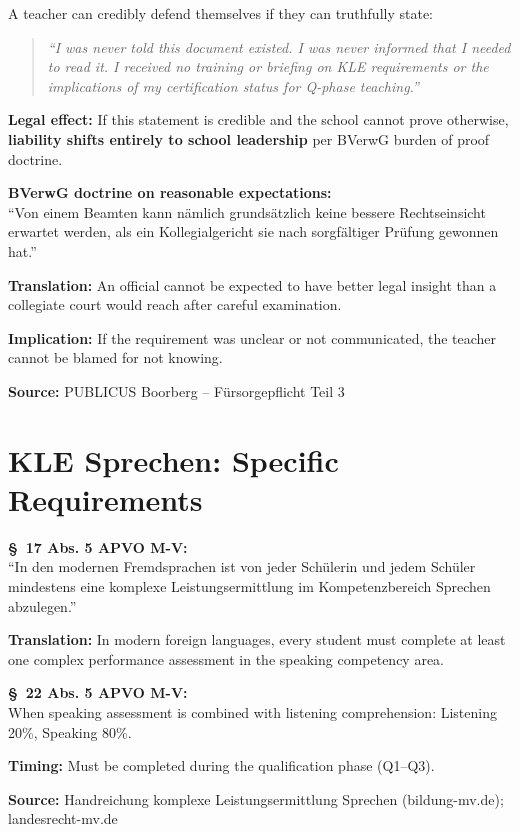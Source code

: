 \documentclass[11pt,a4paper]{article}
\begin{document}
\begin{infobox}
A teacher can credibly defend themselves if they can truthfully state:

\begin{quote}
\textit{``I was never told this document existed. I was never informed that I needed to read it. I received no training or briefing on KLE requirements or the implications of my certification status for Q-phase teaching.''}
\end{quote}

\textbf{Legal effect:} If this statement is credible and the school cannot prove otherwise, \textbf{liability shifts entirely to school leadership} per BVerwG burden of proof doctrine.
\end{infobox}

\begin{sourcebox}
\textbf{BVerwG doctrine on reasonable expectations:}\\
``Von einem Beamten kann nämlich grundsätzlich keine bessere Rechtseinsicht erwartet werden, als ein Kollegialgericht sie nach sorgfältiger Prüfung gewonnen hat.''

\textbf{Translation:} An official cannot be expected to have better legal insight than a collegiate court would reach after careful examination.

\textbf{Implication:} If the requirement was unclear or not communicated, the teacher cannot be blamed for not knowing.

\textbf{Source:} PUBLICUS Boorberg -- Fürsorgepflicht Teil 3
\end{sourcebox}

\section{KLE Sprechen: Specific Requirements}

\begin{sourcebox}
\textbf{\S~17 Abs. 5 APVO M-V:}\\
``In den modernen Fremdsprachen ist von jeder Schülerin und jedem Schüler mindestens eine komplexe Leistungsermittlung im Kompetenzbereich Sprechen abzulegen.''

\textbf{Translation:} In modern foreign languages, every student must complete at least one complex performance assessment in the speaking competency area.

\textbf{\S~22 Abs. 5 APVO M-V:}\\
When speaking assessment is combined with listening comprehension: Listening 20\%, Speaking 80\%.

\textbf{Timing:} Must be completed during the qualification phase (Q1--Q3).

\textbf{Source:} Handreichung komplexe Leistungsermittlung Sprechen (bildung-mv.de); landesrecht-mv.de
\end{sourcebox}
\end{document}
